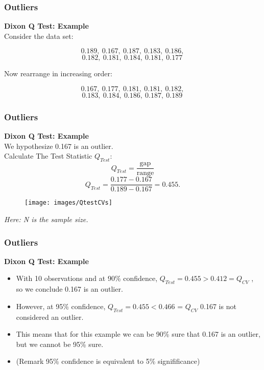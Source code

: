\documentclass{beamer}
\begin{document}
\begin{frame}[fragile]
	\frametitle{Outliers}
	\Large
	
	\textbf{Dixon Q Test: Example}\\
	Consider the data set:
\begin{framed}
		\[0.189,\ 0.167,\ 0.187,\ 0.183,\ 0.186,\]\[ 0.182,\ 0.181,\ 0.184,\ 0.181,\ 0.177 \,\]
\end{framed}
Now rearrange in increasing order:
	\begin{framed}
	\[0.167,\ 0.177,\ 0.181,\ 0.181,\ 0.182,\]\[ 0.183,\ 0.184,\ 0.186,\ 0.187,\ 0.189 \, \]
\end{framed}
\end{frame}
\begin{frame}[fragile]
	\frametitle{Outliers}
	\Large
	\textbf{Dixon Q Test: Example}\\
		We hypothesize 0.167 is an outlier. \\ Calculate The Test Statistic $Q_{Test}$:
	{
	\[ Q_{Test}=\frac{\text{gap}}{\text{range}}  \]
	\[ Q_{Test} 
	= \frac{0.177-0.167}{0.189-0.167}=0.455.\]
}
\end{frame}

\begin{frame}
	\begin{figure}
\centering
\texttt{[image: images/QtestCVs]}
\end{figure}

\textit{Here: N is the sample size.}
\end{frame}
\begin{frame}[fragile]
	\frametitle{Outliers}
	\Large
	\textbf{Dixon Q Test: Example}\\
	\begin{itemize}
\item	With 10 observations and at 90\% confidence, $Q_{Test} = 0.455 > 0.412 =Q_{CV}$ , so we conclude 0.167 is an outlier.
\item  However, at 95\% confidence, $Q_{Test} = 0.455 < 0.466$ = $Q_{CV}$ 0.167 is not considered an outlier. 

\item This means that for this example we can be 90\% sure that 0.167 is an outlier, but we cannot be 95\% sure.
\bigskip
\item (Remark 95\% confidence is equivalent to 5\% signifificance)
	\end{itemize}	
	

	
\end{frame}
\end{document}
